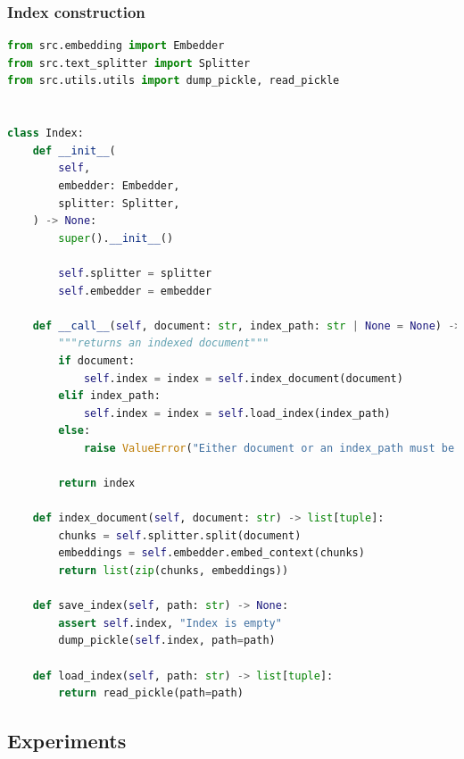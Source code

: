 \documentclass[a4paper,12pt]{article}
\begin{document}
\subsubsection*{Index construction}
\begin{lstlisting}[language=python]
from src.embedding import Embedder
from src.text_splitter import Splitter
from src.utils.utils import dump_pickle, read_pickle


class Index:
    def __init__(
        self,
        embedder: Embedder,
        splitter: Splitter,
    ) -> None:
        super().__init__()

        self.splitter = splitter
        self.embedder = embedder

    def __call__(self, document: str, index_path: str | None = None) -> list[str]:
        """returns an indexed document"""
        if document:
            self.index = index = self.index_document(document)
        elif index_path:
            self.index = index = self.load_index(index_path)
        else:
            raise ValueError("Either document or an index_path must be provided")

        return index

    def index_document(self, document: str) -> list[tuple]:
        chunks = self.splitter.split(document)
        embeddings = self.embedder.embed_context(chunks)
        return list(zip(chunks, embeddings))

    def save_index(self, path: str) -> None:
        assert self.index, "Index is empty"
        dump_pickle(self.index, path=path)

    def load_index(self, path: str) -> list[tuple]:
        return read_pickle(path=path)
\end{lstlisting}
\subsection{Experiments}\label{ann:experiments}
\end{document}
